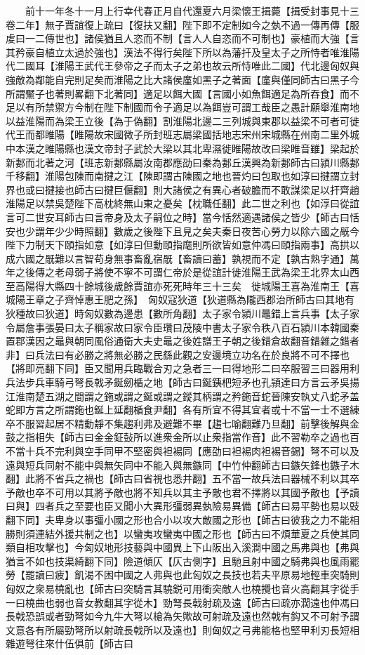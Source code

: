 　　前十一年冬十一月上行幸代春正月自代還夏六月梁懷王揖薨【揖受封事見十三卷二年】無子賈誼復上疏曰【復扶又翻】陛下即不定制如今之埶不過一傳再傳【服䖍曰一二傳世也】諸侯猶且人恣而不制【言人人自恣而不可制也】豪植而大強【言其矜豪自植立太過於強也】漢法不得行矣陛下所以為藩扞及皇太子之所恃者唯淮陽代二國耳【淮陽王武代王參帝之子而太子之弟也故云所恃唯此二國】代北邊匈奴與強敵為鄰能自完則足矣而淮陽之比大諸侯廑如黑子之著面【廑與僅同師古曰黑子今所謂黶子也著則畧翻下北著同】適足以餌大國【言國小如魚餌適足為所吞食】而不足以有所禁禦方今制在陛下制國而令子適足以為餌豈可謂工哉臣之愚計願舉淮南地以益淮陽而為梁王立後【為于偽翻】割淮陽北邊二三列城與東郡以益梁不可者可徙代王而都睢陽【睢陽故宋國微子所封班志屬梁國括地志宋州宋城縣在州南二里外城中本漢之睢陽縣也漢文帝封子武於大梁以其北卑濕徙睢陽故改曰梁睢音雖】梁起於新郪而北著之河【班志新郪縣屬汝南郡應劭曰秦為郪丘漢興為新郪師古曰潁川縣郪千移翻】淮陽包陳而南揵之江【陳即謂古陳國之地也晉灼曰包取也如淳曰揵謂立封界也或曰揵接也師古曰揵巨偃翻】則大諸侯之有異心者破膽而不敢謀梁足以扞齊趙淮陽足以禁吳楚陛下高枕終無山東之憂矣【枕職任翻】此二世之利也【如淳曰從誼言可二世安耳師古曰言帝身及太子嗣位之時】當今恬然適遇諸侯之皆少【師古曰恬安也少謂年少少時照翻】數歲之後陛下且見之矣夫秦日夜苦心勞力以除六國之旤今陛下力制天下頤指如意【如淳曰但動頤指麾則所欲皆如意仲馮曰頤指兩事】高拱以成六國之旤難以言智苟身無事畜亂宿旤【畜讀曰蓄】孰視而不定【孰古熟字通】萬年之後傳之老母弱子將使不寧不可謂仁帝於是從誼計徙淮陽王武為梁王北界太山西至高陽得大縣四十餘城後歲餘賈誼亦死死時年三十三矣　徙城陽王喜為淮南王【喜城陽王章之子齊悼惠王肥之孫】　匈奴寇狄道【狄道縣為隴西郡治所師古曰其地有狄種故曰狄道】時匈奴數為邊患【數所角翻】太子家令潁川鼂錯上言兵事【太子家令屬詹事張晏曰太子稱家故曰家令臣瓚曰茂陵中書太子家令秩八百石潁川本韓國秦置郡漢因之鼂與朝同風俗通衛大夫史鼂之後姓譜王子朝之後錯倉故翻音錯雜之錯者非】曰兵法曰有必勝之將無必勝之民繇此觀之安邊境立功名在於良將不可不擇也【將即亮翻下同】臣又聞用兵臨戰合刃之急者三一曰得地形二曰卒服習三曰器用利兵法步兵車騎弓弩長戟矛鋋劒楯之地【師古曰鋋銕杷短矛也孔頴達曰方言云矛吳揚江淮南楚五湖之間謂之鉇或謂之鋋或謂之鏦其柄謂之矜鉇音蛇晉陳安執丈八蛇矛盖蛇即方言之所謂鉇也鋋上延翻楯食尹翻】各有所宜不得其宜者或十不當一士不選練卒不服習起居不精動靜不集趨利弗及避難不畢【趨七喻翻難乃旦翻】前擊後解與金鼓之指相失【師古曰金金鉦鼔所以進衆金所以止衆指當作音】此不習勒卒之過也百不當十兵不完利與空手同甲不堅密與袒裼同【應劭曰袒裼肉袒裼音錫】弩不可以及遠與短兵同射不能中與無矢同中不能入與無鏃同【中竹仲翻師古曰鏃矢鋒也鏃子木翻】此將不省兵之禍也【師古曰省視也悉井翻】五不當一故兵法曰器械不利以其卒予敵也卒不可用以其將予敵也將不知兵以其主予敵也君不擇將以其國予敵也【予讀曰與】四者兵之至要也臣又聞小大異形彊弱異埶險易異備【師古曰易平勢也易以豉翻下同】夫卑身以事彊小國之形也合小以攻大敵國之形也【師古曰彼我之力不能相勝則須連結外援共制之也】以蠻夷攻蠻夷中國之形也【師古曰不煩華夏之兵使其同類自相攻擊也】今匈奴地形技藝與中國異上下山阪出入溪澗中國之馬弗與也【弗與猶言不如也技渠綺翻下同】險道傾仄【仄古側字】且馳且射中國之騎弗與也風雨罷勞【罷讀曰疲】飢渴不困中國之人弗與也此匈奴之長技也若夫平原易地輕車突騎則匈奴之衆易橈亂也【師古曰突騎言其驍鋭可用衝突敵人也橈攪也音火高翻其字從手一曰橈曲也弱也音女教翻其字從木】勁弩長戟射疏及遠【師古曰疏亦濶遠也仲馮曰長戟恐誤或者勁弩如今九牛大弩以槍為矢歟故可射疏及遠也然戟有鈎又不可射予謂文意各有所屬勁弩所以射疏長戟所以及遠也】則匈奴之弓弗能格也堅甲利刃長短相雜遊弩往來什伍俱前【師古曰